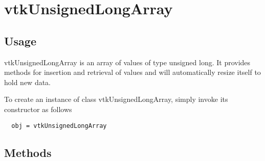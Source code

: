 \section{vtkUnsignedLongArray}

\subsection{Usage}

 vtkUnsignedLongArray is an array of values of type unsigned long.
 It provides methods for insertion and retrieval of values and will
 automatically resize itself to hold new data.

To create an instance of class vtkUnsignedLongArray, simply
invoke its constructor as follows
\begin{verbatim}
  obj = vtkUnsignedLongArray
\end{verbatim}
\subsection{Methods}

